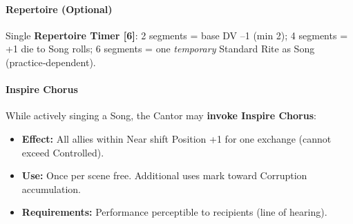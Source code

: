 \paragraph{Repertoire (Optional)}
Single \textbf{Repertoire Timer [6]}: 2 segments = base DV --1 (min 2); 4 segments = +1 die to Song rolls; 6 segments = one \emph{temporary} Standard Rite as Song (practice‑dependent).

\paragraph{Inspire Chorus}\label{subsec:inspire_chorus}
While actively singing a Song, the Cantor may \textbf{invoke Inspire Chorus}:
\begin{itemize}
    \item \textbf{Effect:} All allies within Near shift Position +1 for one exchange (cannot exceed Controlled).
    \item \textbf{Use:} Once per scene free. Additional uses mark toward Corruption accumulation.
    \item \textbf{Requirements:} Performance perceptible to recipients (line of hearing).
\end{itemize}

